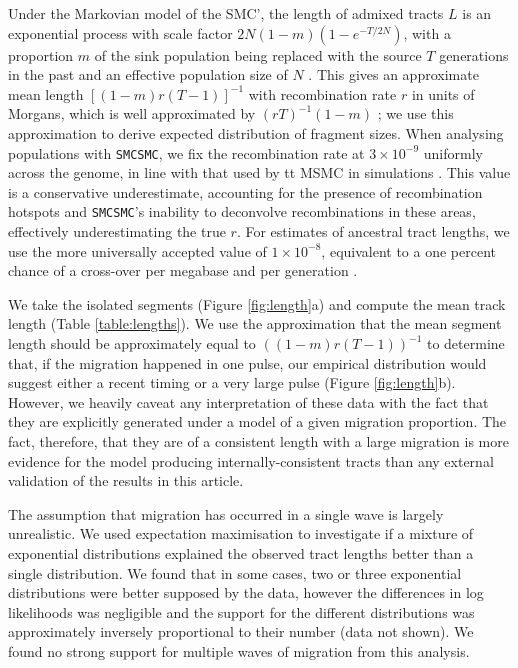  Under the Markovian model of the SMC', the length of admixed tracts $L$ is an exponential process with scale factor $2N (1 - m ) \left( 1 - e^{-T / 2N} \right)$, with a proportion $m$ of the sink population being replaced with the source $T$ generations in the past and an effective population size of $N$ \cite{Marjoram2006,Liang953}. This gives an approximate mean length $\left[ (1 -m)r(T-1) \right]^{-1}$ with recombination rate $r$ in units of Morgans, which is well approximated
by  $(rT)^{-1}(1-m)$ \cite{Racimo2015}; we use this approximation to derive expected distribution of fragment sizes. When analysing populations with {\tt SMCSMC}, we fix the recombination rate at $3 \times 10^{-9}$ uniformly across the genome, in line with that used by {tt MSMC} in simulations \cite[Supp.\ section 7]{Schiffels2014}.
This value is a conservative underestimate, accounting for the presence of recombination hotspots and {\tt SMCSMC}'s inability to deconvolve recombinations in these areas, effectively underestimating the true $r$.  For estimates of ancestral tract lengths, we use the more universally accepted value of $1 \times 10^{-8}$, equivalent to a one percent chance of a cross-over per megabase and per generation \cite{Dumont2008}. 

We take the isolated segments (Figure \ref{fig:length}a) and compute the mean track length (Table \ref{table:lengths}). We use the approximation that the mean segment length should be approximately equal to $((1-m)r(T-1))^{-1}$ to determine that, if the migration happened in one pulse, our empirical distribution would suggest either a recent timing or a very large pulse (Figure \ref{fig:length}b). However, we heavily caveat any interpretation of these data with the fact that they are explicitly generated under a model of a given migration proportion. The fact, therefore, that they are of a consistent length with a large migration is more evidence for the model producing internally-consistent tracts than any external validation of the results in this article. 

The assumption that migration has occurred in a single wave is largely unrealistic. We used expectation maximisation to investigate if a mixture of exponential distributions explained the observed tract lengths better than a single distribution. We found that in some cases, two or three exponential distributions were better supposed by the data, however the differences in log likelihoods was negligible and the support for the different distributions was approximately inversely proportional to their number (data not shown). We found no strong support for multiple waves of migration from this analysis.

